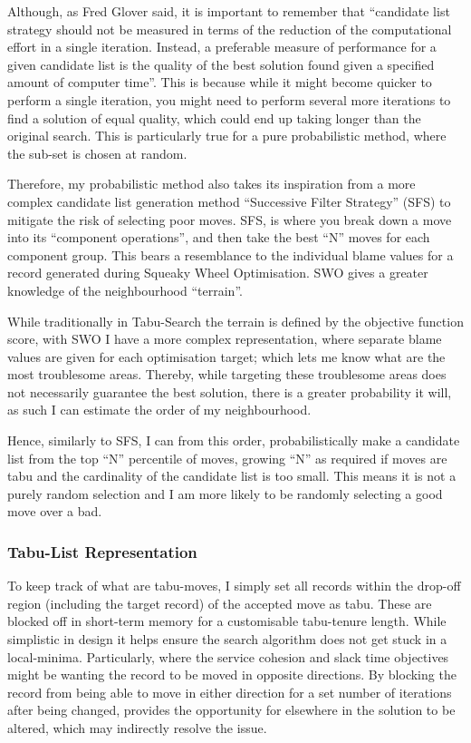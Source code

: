 \documentclass{article}
\begin{document}
\par
Although, as Fred Glover said, it is important to remember that  ``candidate list strategy should not be measured in terms of the reduction of the computational effort in a single iteration. Instead, a preferable measure of performance for a given candidate list is the quality of the best solution found given a specified amount of computer time''\cite{RN37}. This is because while it might become quicker to perform a single iteration, you might need to perform several more iterations to find a solution of equal quality, which could end up taking longer than the original search. This is particularly true for a pure probabilistic method, where the sub-set is chosen at random.

\par 
Therefore, my probabilistic method also takes its inspiration from a more complex candidate list generation method ``Successive Filter Strategy'' (SFS) to mitigate the risk of selecting poor moves. SFS, is where you break down a move into its ``component operations''\cite{RN37}, and then take the best ``N'' moves for each component group. This bears a resemblance to the individual blame values for a record generated during Squeaky Wheel Optimisation. SWO gives a greater knowledge of the neighbourhood ``terrain''. 

\par
While traditionally in Tabu-Search the terrain is defined by the objective function score, with SWO I have a more complex representation, where separate blame values are given for each optimisation target; which lets me know what are the most troublesome areas. Thereby, while targeting these troublesome areas does not necessarily guarantee the best solution, there is a greater probability it will, as such I can estimate the order of my neighbourhood.

\par 
Hence, similarly to SFS, I can from this order, probabilistically make a candidate list from the top ``N'' percentile of moves, growing ``N'' as required if moves are tabu and the cardinality of the candidate list is too small. This means it is not a purely random selection and I am more likely to be randomly selecting a good move over a bad.

\subsubsection{Tabu-List Representation}

To keep track of what are tabu-moves, I simply set all records within the drop-off region (including the target record) of the accepted move as tabu. These are blocked off in short-term memory for a customisable tabu-tenure length. While simplistic in design it helps ensure the search algorithm does not get stuck in a local-minima. Particularly, where the service cohesion and slack time objectives might be wanting the record to be moved in opposite directions. By blocking the record from being able to move in either direction for a set number of iterations after being changed, provides the opportunity for elsewhere in the solution to be altered, which may indirectly resolve the issue.
\end{document}
